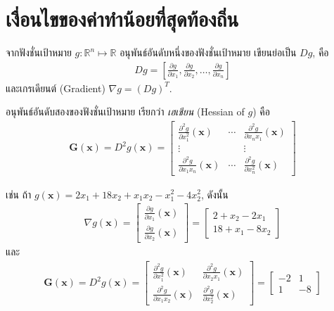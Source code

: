 \section{เงื่อนไขของค่าทำน้อยที่สุดท้องถิ่น}
\label{sec: opt FONC}

จากฟังชั่นเป้าหมาย $g: \mathbb{R}^n \mapsto \mathbb{R}$ อนุพันธ์อันดับหนึ่งของฟังชั่นเป้าหมาย เขียนย่อเป็น $D g$, คือ
\begin{eqnarray}
   D g = \left[ \frac{\partial g}{\partial x_1}, 
                \frac{\partial g}{\partial x_2},
                \ldots,
                \frac{\partial g}{\partial x_n}
         \right]
\end{eqnarray}
และเกรเดียนต์ (Gradient) $\nabla g = (D g)^T$.

อนุพันธ์อันดับสองของฟังชั่นเป้าหมาย เรียกว่า \textit{เฮเชียน} (Hessian of $g$) คือ
\begin{eqnarray}
   \mathbf{G}(\mathbf{x}) = D^2 g(\mathbf{x}) = 
   \begin{bmatrix}
   \frac{\partial^2 g}{\partial x_1^2} (\mathbf{x}) & \cdots & \frac{\partial^2 g}{\partial x_n x_1} (\mathbf{x}) \\
   \vdots    &        & \vdots \\
   \frac{\partial^2 g}{\partial x_1 x_n} (\mathbf{x}) & \cdots & \frac{\partial^2 g}{\partial x_n^2} (\mathbf{x})   
   \end{bmatrix}
\end{eqnarray}

\begin{myexample}
เช่น ถ้า $g(\mathbf{x}) = 2 x_1 + 18 x_2 + x_1 x_2 - x_1^2 - 4 x_2^2$, ดังนั้น
\begin{eqnarray}
   \nabla g (\mathbf{x}) = \begin{bmatrix}
   \frac{\partial g}{\partial x_1} (\mathbf{x}) \\
   \frac{\partial g}{\partial x_2} (\mathbf{x})   
   \end{bmatrix}
   = 
   \begin{bmatrix}
   2 + x_2 - 2 x_1 \\
   18 + x_1 - 8 x_2
   \end{bmatrix}   
\nonumber   
\end{eqnarray}
และ
\begin{eqnarray}
   \mathbf{G}(\mathbf{x}) = D^2 g(\mathbf{x}) = 
   \begin{bmatrix}
   \frac{\partial^2 g}{\partial x_1^2}(\mathbf{x}) & 
     \frac{\partial^2 g}{\partial x_2 x_1}(\mathbf{x}) \\
   \frac{\partial^2 g}{\partial x_1 x_2}(\mathbf{x}) & 
     \frac{\partial^2 g}{\partial x_2^2}(\mathbf{x})
   \end{bmatrix}
   = \begin{bmatrix}
   -2 & 1 \\
   1 & -8
   \end{bmatrix}
\nonumber
\end{eqnarray}
\end{myexample}


